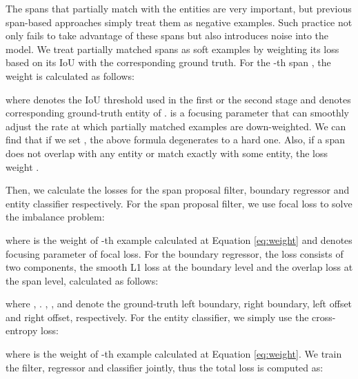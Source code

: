 \documentclass[11pt,a4paper]{article}
\begin{document}
The spans that partially match with the entities are very important, but previous span-based approaches simply treat them as negative examples. Such practice not only fails to take advantage of these spans but also introduces noise into the model. We treat partially matched spans as soft examples by weighting its loss based on its IoU with the corresponding ground truth. For the -th span , the weight  is calculated as follows:




\noindent where  denotes the IoU threshold used in the first or the second stage and  denotes corresponding ground-truth entity of .  is a focusing parameter that can smoothly adjust the rate at which partially matched examples are down-weighted. We can find that if we set , the above formula degenerates to a hard one. Also, if a span does not overlap with any entity or match exactly with some entity, the loss weight .





Then, we calculate the losses for the span proposal filter, boundary regressor and entity classifier respectively. For the span proposal filter, we use focal loss \citep{8237586} to solve the imbalance problem:




\noindent where  is the weight of -th example calculated at Equation \ref{eq:weight} and  denotes focusing parameter of focal loss.  For the boundary regressor, the loss consists of two components, the smooth L1 loss at the boundary level and the overlap loss at the span level, calculated as follows:















\noindent where , . , ,  and  denote the ground-truth left boundary, right boundary, left offset and right offset, respectively. For the entity classifier, we simply use the cross-entropy loss:









\noindent where  is the weight of -th example calculated at Equation \ref{eq:weight}. We train the filter, regressor and classifier jointly, thus the total loss is computed as:
\end{document}
